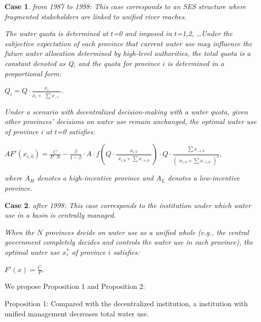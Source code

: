 \documentclass[preprint, 12pt]{elsarticle}
\newtheorem{case}{Case}
\begin{document}
\begin{case} from 1987 to 1998: This case corresponds to an SES structure where fragmented stakeholders are linked to unified river reaches.

 The water quota is determined at $t$=0 and imposed in $t$=1,2, \ldots Under the subjective expectation of each province that current water use may influence the future water allocation determined by high-level authorities, the total quota is a constant denoted as Q, and the quota for province $i$ is determined in a proportional form:

 $Q_i=Q \cdot \frac{x_i}{x_i + \begin{matrix}\sum{x_{-i}} \end{matrix}}$.

Under a scenario with decentralized decision-making with a water quota, given other provinces' decisions on water use remain unchanged, the optimal water use of province $i$ at $t$=0 satisfies:

$AF'(x_{i,0})=\frac{C}{P \cdot N} - \frac{\beta}{1-\beta} \cdot A \cdot f(Q \cdot \frac{x_{i,0}}{\begin{matrix} x_{i,0} + \sum x_{-i,0} \end{matrix}}) \cdot Q \cdot \frac{\begin{matrix} \sum x_{-i,0} \end{matrix}}{(\begin{matrix} x_{i,0} + \sum x_{-i,0} \end{matrix})^2}$,

where $A_H$ denotes a high-incentive province and $A_L$ denotes a low-incentive province.

\end{case}

\begin{case} after 1998: This case corresponds to the institution under which water use in a basin is centrally managed.

 When the $N$ provinces decide on water use as a unified whole (e.g., the central government completely decides and controls the water use in each province), the optimal water use $x_i^*$ of province $i$ satisfies:

$F'(x)=\frac{C}{P}$.

\end{case}

We propose Proposition 1 and Proposition 2:

Proposition 1: Compared with the decentralized institution, a institution with unified management decreases total water use.
\end{document}
